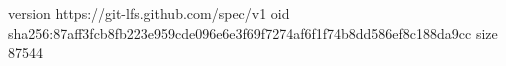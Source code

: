 version https://git-lfs.github.com/spec/v1
oid sha256:87aff3fcb8fb223e959cde096e6e3f69f7274af6f1f74b8dd586ef8c188da9cc
size 87544
